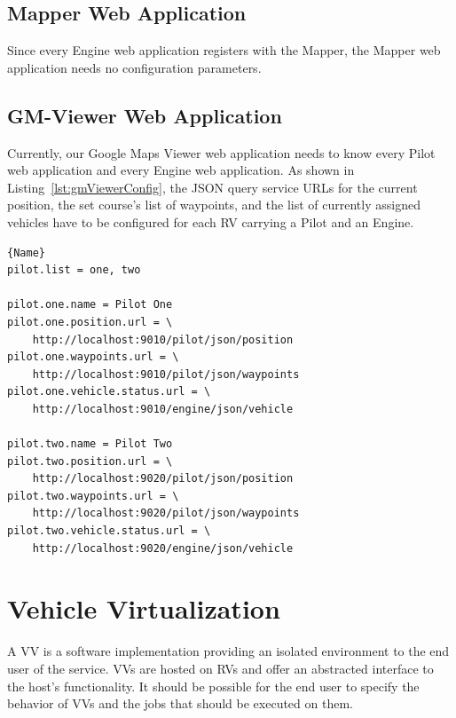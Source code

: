 \subsection{Mapper Web Application}
Since every Engine web application registers with the Mapper, the Mapper web application needs no
configuration parameters.



\subsection{GM-Viewer Web Application}
Currently, our Google Maps Viewer web application needs to know every Pilot web application
and every Engine web application. As shown in Listing~\ref{lst:gmViewerConfig}, the \acs{JSON} \cite{RFC_4627}
query service \acsp{URL} for the current position, the set course's list of waypoints, and the  
list of currently assigned vehicles have to be configured for each \ac{RV} carrying a Pilot and an Engine.   

\lstset{tabsize=3,language=Tex}
\begin{lstlisting}[caption={Google Maps Viewer Configuration Example},mathescape=true,label=lst:gmViewerConfig]{Name}
pilot.list = one, two

pilot.one.name = Pilot One
pilot.one.position.url = \
	http://localhost:9010/pilot/json/position
pilot.one.waypoints.url = \
	http://localhost:9010/pilot/json/waypoints
pilot.one.vehicle.status.url = \
	http://localhost:9010/engine/json/vehicle

pilot.two.name = Pilot Two
pilot.two.position.url = \
	http://localhost:9020/pilot/json/position
pilot.two.waypoints.url = \
	http://localhost:9020/pilot/json/waypoints
pilot.two.vehicle.status.url = \
	http://localhost:9020/engine/json/vehicle
\end{lstlisting}





\section{Vehicle Virtualization}

A \acf{VV} is a software implementation providing an isolated environment to the end user of the service. \acp{VV} are
hosted on \acfp{RV} and offer an abstracted interface to the host's functionality. It should be possible for the end
user to specify the behavior of \acp{VV} and the jobs that should be executed on them.


